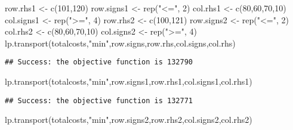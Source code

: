 \documentclass[
]{article}
\newenvironment{Shaded}{\begin{snugshade}}{\end{snugshade}}
\newcommand{\DecValTok}[1]{\textcolor[rgb]{0.00,0.00,0.81}{#1}}
\newcommand{\FunctionTok}[1]{\textcolor[rgb]{0.00,0.00,0.00}{#1}}
\newcommand{\NormalTok}[1]{#1}
\newcommand{\OtherTok}[1]{\textcolor[rgb]{0.56,0.35,0.01}{#1}}
\newcommand{\StringTok}[1]{\textcolor[rgb]{0.31,0.60,0.02}{#1}}
\begin{document}
\begin{Shaded}
\begin{Highlighting}[]
\NormalTok{row.rhs1 }\OtherTok{\textless{}{-}} \FunctionTok{c}\NormalTok{(}\DecValTok{101}\NormalTok{,}\DecValTok{120}\NormalTok{)}
\NormalTok{ row.signs1 }\OtherTok{\textless{}{-}} \FunctionTok{rep}\NormalTok{(}\StringTok{"\textless{}="}\NormalTok{, }\DecValTok{2}\NormalTok{)}
\NormalTok{ col.rhs1 }\OtherTok{\textless{}{-}} \FunctionTok{c}\NormalTok{(}\DecValTok{80}\NormalTok{,}\DecValTok{60}\NormalTok{,}\DecValTok{70}\NormalTok{,}\DecValTok{10}\NormalTok{)}
\NormalTok{ col.signs1 }\OtherTok{\textless{}{-}} \FunctionTok{rep}\NormalTok{(}\StringTok{"\textgreater{}="}\NormalTok{, }\DecValTok{4}\NormalTok{)}
\NormalTok{ row.rhs2 }\OtherTok{\textless{}{-}} \FunctionTok{c}\NormalTok{(}\DecValTok{100}\NormalTok{,}\DecValTok{121}\NormalTok{)}
\NormalTok{ row.signs2 }\OtherTok{\textless{}{-}} \FunctionTok{rep}\NormalTok{(}\StringTok{"\textless{}="}\NormalTok{, }\DecValTok{2}\NormalTok{)}
\NormalTok{ col.rhs2 }\OtherTok{\textless{}{-}} \FunctionTok{c}\NormalTok{(}\DecValTok{80}\NormalTok{,}\DecValTok{60}\NormalTok{,}\DecValTok{70}\NormalTok{,}\DecValTok{10}\NormalTok{)}
\NormalTok{ col.signs2 }\OtherTok{\textless{}{-}} \FunctionTok{rep}\NormalTok{(}\StringTok{"\textgreater{}="}\NormalTok{, }\DecValTok{4}\NormalTok{)}
 \FunctionTok{lp.transport}\NormalTok{(totalcosts,}\StringTok{"min"}\NormalTok{,row.signs,row.rhs,col.signs,col.rhs)}
\end{Highlighting}
\end{Shaded}

\begin{verbatim}
## Success: the objective function is 132790
\end{verbatim}

\begin{Shaded}
\begin{Highlighting}[]
 \FunctionTok{lp.transport}\NormalTok{(totalcosts,}\StringTok{"min"}\NormalTok{,row.signs1,row.rhs1,col.signs1,col.rhs1)}
\end{Highlighting}
\end{Shaded}

\begin{verbatim}
## Success: the objective function is 132771
\end{verbatim}

\begin{Shaded}
\begin{Highlighting}[]
\FunctionTok{lp.transport}\NormalTok{(totalcosts,}\StringTok{"min"}\NormalTok{,row.signs2,row.rhs2,col.signs2,col.rhs2)}
\end{Highlighting}
\end{Shaded}
\end{document}
